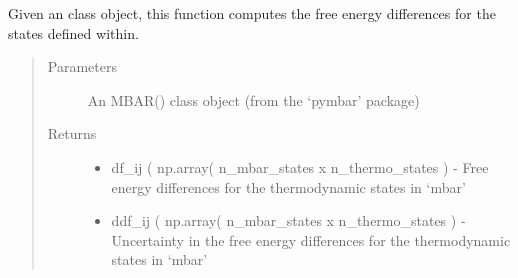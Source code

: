 \documentclass[letterpaper,12pt,english,openany,oneside]{sphinxmanual}
\begin{document}
\label{\detokenize{thermo:module-parameters.reweight}}

\begin{fulllineitems}
\label{\detokenize{thermo:parameters.reweight.get_free_energy_differences}}
Given an  class object, this function computes the free energy differences for the states defined within.
\begin{quote}\begin{description}
\item[{Parameters}] \leavevmode
{} \textendash{} An MBAR() class object (from the ‘pymbar’ package)

\item[{Returns}] \leavevmode
\begin{itemize}
\item {} 
df\_ij ( np.array( n\_mbar\_states x n\_thermo\_states ) - Free energy differences for the thermodynamic states in ‘mbar’

\item {} 
ddf\_ij ( np.array( n\_mbar\_states x n\_thermo\_states ) - Uncertainty in the free energy differences for the thermodynamic states in ‘mbar’

\end{itemize}


\end{description}\end{quote}

\end{fulllineitems}

\end{document}
